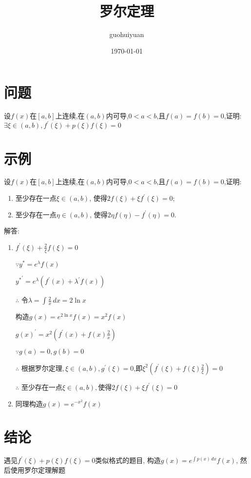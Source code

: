 \documentclass[UTF8, 12pt]{ctexart}
\begin{document}


\title{罗尔定理} %
\author{guohuiyuan} %
\date{\today} %

\maketitle %

\section{问题} %
设$f(x)$在$[a,b]$上连续,在$(a,b)$内可导,$0<a<b$,且$f(a)=f(b)=0$,证明:$\exists \xi \in(a,b), f^{\prime}(\xi)+p(\xi)f(\xi)=0$

\section{示例}
设$f(x)$在$[a,b]$上连续,在$(a,b)$内可导,$0<a<b$,且$f(a)=f(b)=0$,证明:
\begin{enumerate}
\item 至少存在一点$\xi \in(a, b)$, 使得$2 f(\xi)+\xi f^{\prime}(\xi)=0$;
\item 至少存在一点$\eta \in(a, b)$, 使得$2 \eta f(\eta)-f^{\prime}(\eta)=0$.
\end{enumerate}

解答:
\begin{enumerate}
\item 
$f^{\prime}(\xi)+ \tfrac{2}{\xi}f(\xi)=0$

$\because y^*=e^\lambda f(x) $

${y^*}^{\prime}=e^\lambda(f^{\prime}(x)+\lambda^{\prime}f(x))$

$\therefore$ 令$\lambda=\int \tfrac{2}{x}  \,dx=2\ln x$

构造$g(x)=e^{2\ln x}f(x)=x^2f(x)$

${g(x)}^{\prime}=x^2(f^{\prime}(x)+f(x)\tfrac{2}{x})$

$\because g(a)=0,g(b)=0$

$\therefore$ 根据罗尔定理$,\xi \in(a, b),g^{\prime}(\xi)=0$,即$\xi^2(f^{\prime}(\xi)+f(\xi)\tfrac{2}{\xi})=0$

$\therefore$ 至少存在一点$\xi \in(a, b), $使得$2 f(\xi)+\xi f^{\prime}(\xi)=0$

\item
同理构造$g(x)=e^{-x^2}f(x)$
\end{enumerate}

\section{结论}
遇见$f^{\prime}(\xi)+p(\xi)f(\xi)=0$类似格式的题目, 构造$g(x)=e^{\int p(x) \,dx } f(x)$, 然后使用罗尔定理解题
\end{document}
